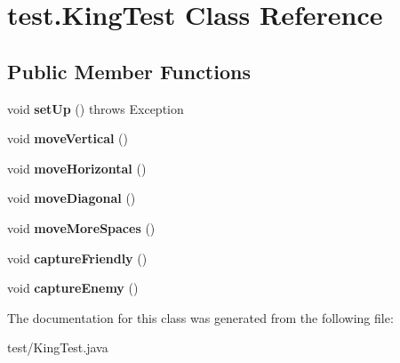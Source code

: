 \hypertarget{classtest_1_1KingTest}{\section{test.\-King\-Test Class Reference}
\label{classtest_1_1KingTest}
}
\subsection*{Public Member Functions}
\begin{DoxyCompactItemize}
\item 
\hypertarget{classtest_1_1KingTest_a1da7d245e24339970bca8158dfd6bd45}{void {\bfseries set\-Up} ()  throws Exception }\label{classtest_1_1KingTest_a1da7d245e24339970bca8158dfd6bd45}

\item 
\hypertarget{classtest_1_1KingTest_ab13863f94a4e5e9f45988ff874582c21}{void {\bfseries move\-Vertical} ()}\label{classtest_1_1KingTest_ab13863f94a4e5e9f45988ff874582c21}

\item 
\hypertarget{classtest_1_1KingTest_a1cc16f9e7ad7fea5e3784004790283c2}{void {\bfseries move\-Horizontal} ()}\label{classtest_1_1KingTest_a1cc16f9e7ad7fea5e3784004790283c2}

\item 
\hypertarget{classtest_1_1KingTest_a8b4e81b3b39ef66725432e8ee0b63282}{void {\bfseries move\-Diagonal} ()}\label{classtest_1_1KingTest_a8b4e81b3b39ef66725432e8ee0b63282}

\item 
\hypertarget{classtest_1_1KingTest_aa1ea48313b15b211f16db02af641a560}{void {\bfseries move\-More\-Spaces} ()}\label{classtest_1_1KingTest_aa1ea48313b15b211f16db02af641a560}

\item 
\hypertarget{classtest_1_1KingTest_acfe60444914ffd834a35e95ad6f93b9e}{void {\bfseries capture\-Friendly} ()}\label{classtest_1_1KingTest_acfe60444914ffd834a35e95ad6f93b9e}

\item 
\hypertarget{classtest_1_1KingTest_a40c1423979401880a556ee7de364ec1e}{void {\bfseries capture\-Enemy} ()}\label{classtest_1_1KingTest_a40c1423979401880a556ee7de364ec1e}

\end{DoxyCompactItemize}


The documentation for this class was generated from the following file\-:\begin{DoxyCompactItemize}
\item 
test/King\-Test.\-java\end{DoxyCompactItemize}
